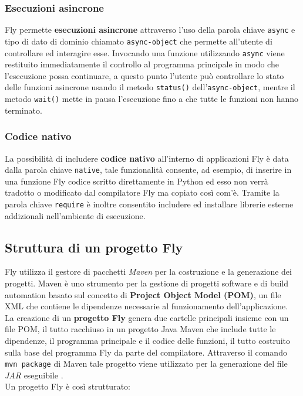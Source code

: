 \subsubsection{Esecuzioni asincrone}
Fly permette \textbf{esecuzioni asincrone} attraverso l'uso della parola chiave \verb|async| e tipo di dato di dominio chiamato \verb|async-object| che permette all'utente di controllare ed interagire esse. Invocando una funzione utilizzando \verb|async| viene restituito immediatamente il controllo al programma principale in modo che l'esecuzione possa continuare, a questo punto l'utente può controllare lo stato delle funzioni asincrone usando il metodo \verb|status()| dell'\verb|async-object|, mentre il metodo \verb|wait()| mette in pausa l'esecuzione fino a che tutte le funzioni non hanno terminato.

\subsubsection{Codice nativo}
La possibilità di includere \textbf{codice nativo} all'interno di applicazioni Fly è data dalla parola chiave \verb|native|, tale funzionalità consente, ad esempio, di inserire in una funzione Fly codice scritto direttamente in Python ed esso non verrà tradotto o modificato dal compilatore Fly ma copiato così com'è. Tramite la parola chiave \verb|require| è inoltre consentito includere ed installare librerie esterne addizionali nell'ambiente di esecuzione.

\subsection{Struttura di un progetto Fly}
Fly utilizza il gestore di pacchetti \textit{Maven} \cite{MavenSite} per la costruzione e la generazione dei progetti. Maven è uno strumento per la gestione di progetti software e di build automation basato sul concetto di \textbf{Project Object Model (POM)}, un file XML che contiene le dipendenze necessarie al funzionamento dell'applicazione. \\
La creazione di un \textbf{progetto Fly} genera due cartelle principali insieme con un file POM, il tutto racchiuso in un progetto Java Maven che include tutte le dipendenze, il programma principale e il codice delle funzioni, il tutto costruito sulla base del programma Fly da parte del compilatore. Attraverso il comando \verb|mvn package| di Maven tale progetto viene utilizzato per la generazione del file \textit{JAR} eseguibile \cite{ISISLab}.\\
Un progetto Fly è così strutturato:

